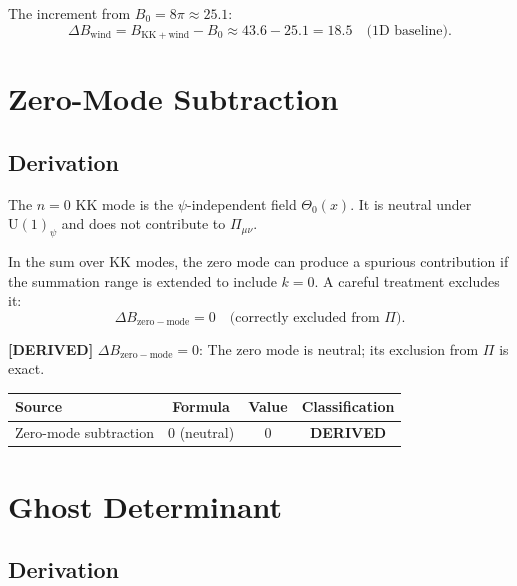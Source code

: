 \documentclass[11pt,a4paper]{article}
\newcommand{\derived}[1]{\textbf{[DERIVED]} #1}
\begin{document}
The increment from $B_0 = 8\pi \approx 25.1$:
\begin{equation}
  \Delta B_\mathrm{wind} = B_\mathrm{KK+wind} - B_0 \approx 43.6 - 25.1 = 18.5
  \quad\text{(1D baseline)}.
\end{equation}

\section{Zero-Mode Subtraction}

\subsection{Derivation}

The $n=0$ KK mode is the $\psi$-independent field $\Theta_0(x)$.  It is neutral
under $\mathrm{U}(1)_\psi$ and does not contribute to $\Pi_{\mu\nu}$.

In the sum over KK modes, the zero mode can produce a spurious contribution if the
summation range is extended to include $k = 0$.  A careful treatment excludes it:
\begin{equation}
  \Delta B_\mathrm{zero-mode} = 0 \quad \text{(correctly excluded from $\Pi$)}.
\end{equation}

\derived{$\Delta B_\mathrm{zero-mode} = 0$}: The zero mode is neutral; its exclusion
from $\Pi$ is exact.

\begin{center}
\begin{tabular}{lccc}
\toprule
Source & Formula & Value & Classification \\\midrule
Zero-mode subtraction & 0 (neutral) & $0$ & \textbf{DERIVED} \\\bottomrule
\end{tabular}
\end{center}

\section{Ghost Determinant}

\subsection{Derivation}
\end{document}
